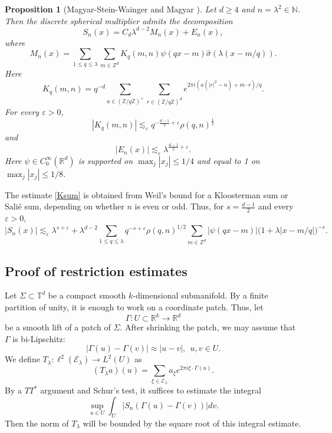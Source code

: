 \documentclass[11pt,reqno]{amsart}
\newtheorem{proposition}[theorem]{Proposition}
\numberwithin{equation}{section}
\newcommand{\1}{\textbf{1}}
\newcommand{\ls}{\lesssim}
\newcommand{\R}{\mathbb R}
\newcommand{\Z}{\mathbb Z}
\newcommand{\N}{\mathbb N}
\newcommand{\eps}{\varepsilon}
\newcommand{\la}{\lambda}
\newcommand{\E}{\mathcal{E}}
\begin{document}
	
	\begin{proposition}[Magyar-Stein-Wainger \cite{msw} and Magyar \cite{m}]\label{propm}
		Let \(d\ge4\) and \(n=\la^2\in\N\).  Then
		the discrete spherical multiplier admits the decomposition
		\begin{equation}
			S_n(x)=C_d\la^{d-2}M_n(x)+E_n(x),
		\end{equation}
		where
		\begin{equation}
			M_n(x)=
			\sum_{1\le q\le\la}\sum_{m\in\Z^d}
			K_q(m,n)\psi(qx-m)\widehat\sigma(\la(x-m/q)).
		\end{equation}
		Here
		\begin{equation}
			K_q(m,n)=q^{-d}
			\sum_{a\in(\Z/q\Z)^\times}
			\sum_{r\in(\Z/q\Z)^d}e^{2\pi i(a(|r|^2-n)+m\cdot r)/q}.
		\end{equation}
		For every \(\eps>0\),
		\begin{equation}\label{Ksum}	|K_q(m,n)|\ls_{\eps}q^{-\frac{d-1}2+\eps}\rho(q,n)^{\frac12}
		\end{equation}
		and
		\begin{equation}
			|E_n(x)|\ls_{\eps} \la^{\frac{d-1}2+\eps}.
		\end{equation}
		Here 
		\(\psi\in C_0^\infty(\R^d)\) is supported on \(\max_j|x_j|\le1/4\) and equal to 1 on \(\max_j|x_j|\le1/8\).
	\end{proposition}
	The estimate \eqref{Ksum} is obtained from Weil's bound \cite[Chapter 4]{s1990} for a Kloosterman sum or Sali\'e sum, depending on whether $n$ is even or odd. Thus, for $s=\frac{d-1}2$ and every \(\eps>0\),
	\begin{equation}\label{sn}
		|S_n(x)|
		\ls_{\eps}\la^{s+\eps}+\la^{d-2}
		\sum_{1\le q\le\la}q^{-s+\eps}\rho(q,n)^{1/2}
		\sum_{m\in\Z^d}
		|\psi(qx-m)|
		\bigl(1+\la|x-m/q|\bigr)^{-s}.
	\end{equation}
	
	
	\subsection{Proof of restriction estimates}
	Let $\Sigma\subset \mathbb{T}^d$ be a compact smooth $k$-dimensional submanifold. By a finite partition of unity, it is enough to work on a coordinate patch. Thus, let 
	\[\Gamma: U\subset \mathbb{R}^k\to \mathbb{R}^d\]
	be a smooth lift of a patch of $\Sigma$. After shrinking the patch, we may assume that $\Gamma$ is bi-Lipschitz:
	\begin{equation}\label{bl}
		|\Gamma(u)-\Gamma(v)|\approx |u-v|,\ \ u,v\in U.
	\end{equation}
	We define $T_\la:\ell^2(\E_\la)\to L^2(U)$ as
	\[(T_\la a)(u)=\sum_{\xi\in \E_\la}a_\xi e^{2\pi i\xi\cdot \Gamma(u)}.\]
	By a $TT^*$ argument and Schur's test, it suffices to estimate the integral
	\begin{equation}\label{schur}
		\sup_{u\in U}\int_U|S_n(\Gamma(u)-\Gamma(v))|dv.
	\end{equation}
	Then the norm of $T_\la$ will be bounded by the square root of this integral estimate.
	
\end{document}
